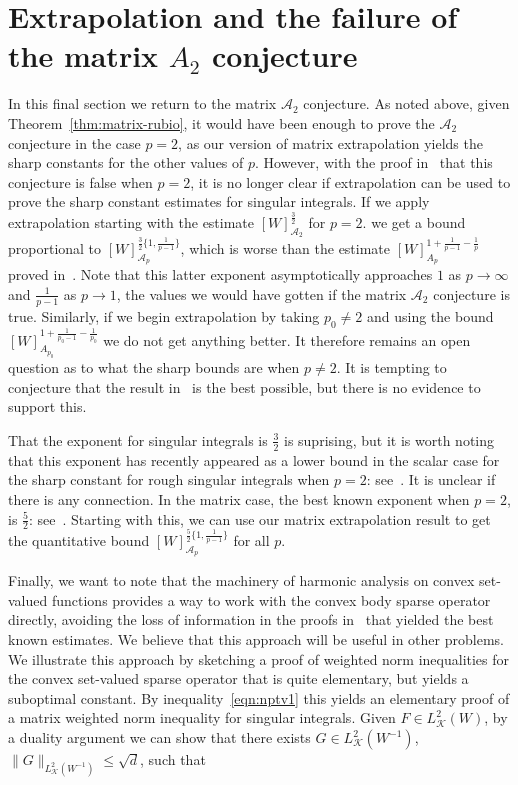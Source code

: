 \documentclass[12pt]{amsart}
\theoremstyle{definition}
\theoremstyle{remark}
\numberwithin{equation}{section}
\newcommand{\A}{\mathcal A}
\newcommand{\K}{\mathcal K}
\begin{document}
\section{Extrapolation and the failure of the matrix
  $A_2$ conjecture}
\label{section:guess}

In this final section we return to the matrix $\A_2$
conjecture.  As noted above, given Theorem~\ref{thm:matrix-rubio}, it
would have been
enough to prove the $\A_2$ conjecture in the case $p=2$, as our version of matrix
extrapolation yields the sharp constants for the other values of $p$.
However, with the proof in~\cite{DPTV-2024} that this conjecture is
false when $p=2$, it is no longer clear if extrapolation can be used
to prove the sharp constant estimates for singular integrals.  If we
apply extrapolation starting with the estimate $[W]_{\A_2}^{\frac{3}{2}}$ for $p=2$. we get a
bound proportional to $[W]_{\A_p}^{\frac{3}{2}\{1,\frac{1}{p-1}\}}$,
which is worse than the estimate
$[W]_{A_p}^{1+\frac{1}{p-1}-\frac{1}{p}}$
proved in~\cite{MR3803292}.   Note that this latter exponent 
asymptotically approaches $1$ as $p\rightarrow \infty$ and
$\frac{1}{p-1}$ as $p\rightarrow 1$, the values we would have gotten
if the matrix $\A_2$ conjecture is true.  Similarly, if we begin extrapolation
by taking $p_0\neq 2$ and using the bound
$[W]_{A_{p_0}}^{1+\frac{1}{p_0-1}-\frac{1}{p_0}}$ we do not get
anything better.   It therefore remains an open question as to what
the sharp bounds are when $p\neq 2$.   It is tempting to conjecture
that the result in~\cite{MR3803292} is the best possible, but there is
no evidence to support this.  

That the exponent for singular integrals is $\frac{3}{2}$ is
suprising,  but  it is worth noting that this exponent has
  recently appeared as a lower bound in the scalar case  for the sharp
  constant for rough singular integrals when $p=2$:  see~\cite{MR4584703}.
  It is unclear if there is any connection.   In the matrix case, the
  best known exponent when $p=2$, is $\frac{5}{2}$:  see~\cite{MR4245601}.
  Starting with this, we can use our matrix extrapolation result  to get the quantitative bound
  $[W]_{\A_p}^{\frac{5}{2}\{1,\frac{1}{p-1}\}}$ for all $p$. 

  \medskip
  
Finally, we want to note that the machinery of harmonic analysis on convex set-valued
functions provides a way to work with the convex body sparse operator
directly, avoiding the loss of information in the proofs in~\cite{MR3689742,MR3803292} that
yielded the best known estimates. We believe that this approach will
be useful in other problems.  We illustrate this approach by sketching a proof  of weighted norm
inequalities for the convex
set-valued sparse operator that is quite elementary, but yields a
suboptimal constant.  By inequality~\eqref{eqn:nptv1} this yields an
elementary proof of a matrix weighted norm inequality for singular
integrals.    Given $F\in L^2_\K(W)$, by a duality argument we can
show that there exists $G \in L^2_\K(W^{-1})$, $\|G\|_{L^2_\K(W^{-1})} \leq
\sqrt{d}$, such that 
\end{document}
